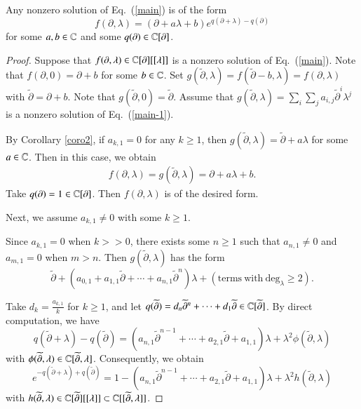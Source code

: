 \documentclass[12pt]{amsart}
\begin{document}
\begin{lem}\label{thm-1}
Any nonzero solution of Eq.~(\ref{main}) is of the form
$$f(\partial, \lambda)=(\partial+a \lambda+b)e^{q(\partial+\lambda)-q(\partial)}$$ for some $a,b\in\mathbb{C}$ and some $q(\partial)\in\mathbb{C}[\partial]$.
\end{lem}
\begin{proof}
Suppose that $f(\partial, \lambda)\in \mathbb{C}[\partial][[\lambda]]$ is a nonzero solution
of Eq.~(\ref{main}). Note that $f(\partial, 0)=\partial+b$ for some $b\in \mathbb{C}$. Set $g(\widetilde{\partial}, \lambda)=f(\widetilde{\partial}-b, \lambda)=f(\partial, \lambda)$ with $\widetilde{\partial}=\partial+b$.
Note that $g(\widetilde{\partial},0)=\widetilde{\partial}$. Assume that $g(\widetilde{\partial}, \lambda)=\sum_i\sum_j a_{i,j}\widetilde{\partial}^i \lambda^j$ is a nonzero solution of Eq.~(\ref{main-1}).

By Corollary \ref{coro2}, if $a_{k,1}=0$ for any $k\geq 1$, then $g(\widetilde{\partial}, \lambda)=\widetilde{\partial}+a\lambda$ for some $a\in \mathbb{C}$. Then in this case, we obtain
\begin{eqnarray*}
f(\partial, \lambda)=g(\widetilde{\partial}, \lambda)=\partial+a\lambda+b.
\end{eqnarray*}
Take $q(\partial)=1\in \mathbb{C}[\partial]$. Then $f(\partial, \lambda)$ is of the desired form.

Next, we assume $a_{k,1}\neq 0$ with some $k\geq 1$.

Since $a_{k,1}=0$ when $k>>0$, there exists some $n\geq 1$ such that $a_{n,1}\neq 0$ and $a_{m,1}=0$ when $m>n$.
Then $g(\widetilde{\partial},\lambda)$ has the form
$$\widetilde{\partial}+(a_{0,1}+a_{1,1}\widetilde{\partial}+\cdots+a_{n,1}\widetilde{\partial}^n)\lambda+(\text{terms}\ \text{with}\ \text{deg}_\lambda\geq2).$$

Take $d_k=\frac{a_{k,1}}{k}$ for $k\geq 1$, and let $q(\widetilde{\partial})=d_n\widetilde{\partial}^n+\cdots+d_1\widetilde{\partial}\in\mathbb{C}[\widetilde{\partial}]$.
By direct computation, we have
$$q(\widetilde{\partial}+\lambda)-q(\widetilde{\partial})=(a_{n,1}\widetilde{\partial}^{n-1}+\cdots+a_{2,1}\widetilde{\partial}+a_{1,1})\lambda+\lambda^2\phi(\widetilde{\partial}, \lambda)$$
with $\phi(\widetilde{\partial}, \lambda)\in \mathbb{C}[\widetilde{\partial},\lambda]$.
Consequently, we obtain $$e^{-q(\widetilde{\partial}+\lambda)+q(\widetilde{\partial})}=1-(a_{n,1}\widetilde{\partial}^{n-1}+\cdots+a_{2,1}\widetilde{\partial}+a_{1,1})\lambda+\lambda^2h(\widetilde{\partial}, \lambda)$$
with $h(\widetilde{\partial}, \lambda)\in \mathbb{C}[\widetilde{\partial}][[\lambda]]\subset \mathbb{C}[[\widetilde{\partial},\lambda]]$.


\end{proof}
\end{document}
